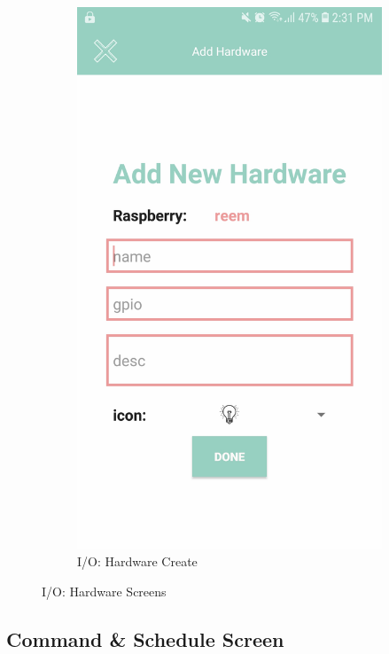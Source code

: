 \documentclass[12pt, oneside, a4paper]{book}
\begin{document}
\begin{figure}[H]
\begin{subfigure}[b]{.35\linewidth}
				\includegraphics[width=\linewidth]{img/output_hardware_new.jpg}
				\caption{I/O: Hardware Create}
			\end{subfigure}
			\caption{I/O: Hardware Screens}
			\label{output:hardware}
		\end{figure}

		\newpage\subsection{Command \& Schedule Screen}
\end{document}
